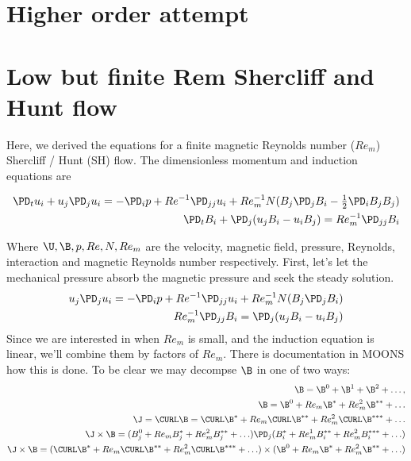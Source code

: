 \documentclass[11pt]{article}
\begin{document}
\doublespacing
\MOONSTITLE
\maketitle

\section{Higher order attempt}
\section{Low but finite Rem Shercliff and Hunt flow}
Here, we derived the equations for a finite magnetic Reynolds number ($Re_m$) Shercliff / Hunt (SH) flow. The dimensionless momentum and induction equations are

\begin{equation}\begin{aligned}
\PD_t u_i+u_j\PD_j u_i =-\PD_i p+ Re^{-1} \PD_{jj} u_i + Re_m^{-1} N (B_j \PD_j B_i - \tfrac{1}{2} \PD_i B_j B_j) \\
\PD_t B_i + \PD_j (u_j B_i - u_i B_j) = Re_m^{-1} \PD_{jj} B_i
\end{aligned} \end{equation}

Where $\U,\B,p,Re,N,Re_m$ are the velocity, magnetic field, pressure, Reynolds, interaction and magnetic Reynolds number respectively. First, let's let the mechanical pressure absorb the magnetic pressure and seek the steady solution.
\begin{equation}\begin{aligned}
u_j\PD_j u_i =-\PD_i p+ Re^{-1} \PD_{jj} u_i + Re_m^{-1} N (B_j \PD_j B_i) \\
Re_m^{-1} \PD_{jj} B_i = \PD_j (u_j B_i - u_i B_j)
\end{aligned} \end{equation}
Since we are interested in when $Re_m$ is small, and the induction equation is linear, we'll combine them by factors of $Re_m$. There is documentation in MOONS how this is done. To be clear we may decompse $\B$ in one of two ways:
\begin{equation}\begin{aligned}
	\B = \B^0 + \B^1 + \B^2 + \hdots , \\
	\B = \B^0 + Re_m \B^* + Re_m^2 \B^{**} + \hdots \\
	\J = \CURL \B = \CURL \B^* + Re_m \CURL \B^{**} + Re_m^2 \CURL \B^{***} + \hdots \\
	\J \times \B = (B_j^0+Re_m B_j^*+Re_m^2 B_j^{**} + \hdots) \PD_j (B_i^*+Re_m^1 B_i^{**}+Re_m^2 B_i^{***} + \hdots) \\
	\J \times \B = (\CURL \B^* + Re_m \CURL \B^{**} + Re_m^2 \CURL \B^{***} + \hdots) \times (\B^0 + Re_m \B^* + Re_m^2 \B^{**} + \hdots) \\
\end{aligned} \end{equation}
\end{document}
